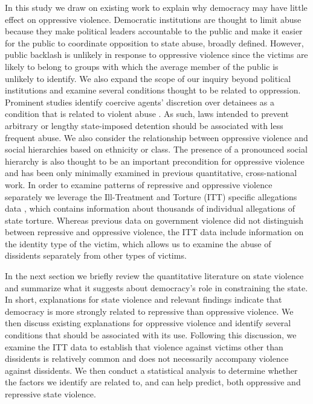 \documentclass[11pt]{article}
\begin{document}
In this study we draw on existing work to explain why democracy may have little effect on oppressive violence. Democratic institutions are thought to limit abuse because they make political leaders accountable to the public and make it easier for the public to coordinate opposition to state abuse, broadly defined. However, public backlash is unlikely in response to oppressive violence since the victims are likely to belong to groups with which the average member of the public is unlikely to identify. We also expand the scope of our inquiry beyond political institutions and examine several conditions thought to be related to oppression. Prominent studies identify coercive agents' discretion over detainees as a condition that is related to violent abuse \citep{Rejali2007,ConradMoore2010}. As such, laws intended to prevent arbitrary or lengthy state-imposed detention should be associated with less frequent abuse. We also consider the relationship between oppressive violence and social hierarchies based on ethnicity or class. The presence of a pronounced social hierarchy is also thought to be an important precondition for oppressive violence \citep{Rejali2007} and has been only minimally examined in previous quantitative, cross-national work. In order to examine patterns of repressive and oppressive violence separately we leverage the Ill-Treatment and Torture (ITT) specific allegations data \citep{ConradHaglundMoore2014}, which contains information about thousands of individual allegations of state torture. Whereas previous data on government violence did not distinguish between repressive and oppressive violence, the ITT data include information on the identity type of the victim, which allows us to examine the abuse of dissidents separately from other types of victims. 

In the next section we briefly review the quantitative literature on state violence and summarize what it suggests about democracy's role in constraining the state. In short, explanations for state violence and relevant findings indicate that democracy is more strongly related to repressive than oppressive violence. We then discuss existing explanations for oppressive violence and identify several conditions that should be associated with its use. Following this discussion, we examine the ITT data to establish that violence against victims other than dissidents is relatively common and does not necessarily accompany violence against dissidents. We then conduct a statistical analysis to determine whether the factors we identify are related to, and can help predict, both oppressive and repressive state violence. 
\end{document}
